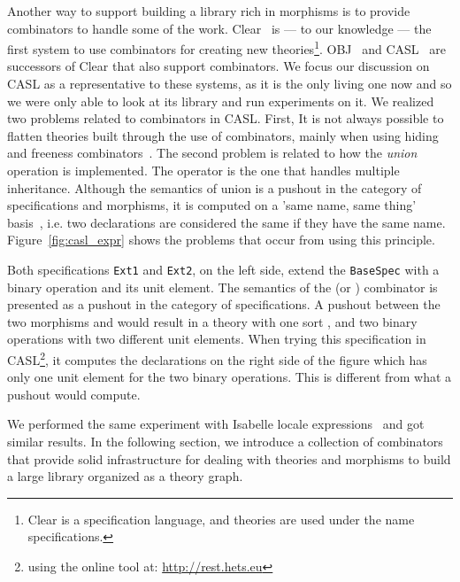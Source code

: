 Another way to support building a library rich in morphisms is to provide combinators to handle some of the work. Clear~\cite{Goguen1980} is --- to our knowledge --- the first system to use combinators for creating new theories\footnote{Clear is a specification language, and theories are used under the name specifications.}. OBJ~\cite{Obj2000Goguen} and CASL~\cite{CoFI:2004:CASL-RM} are successors of Clear that also support combinators. We focus our discussion on CASL as a representative to these systems, as it is the only living one now and so we were only able to look at its library and run experiments on it. 
We realized two problems related to combinators in CASL. First, It is not always possible to flatten theories built through the use of combinators, mainly when using hiding and freeness combinators~\cite{CoFI:2004:CASL-RM}. The second problem is related to how the \emph{union} operation is implemented. The  operator is the one that handles multiple inheritance. Although the semantics of union is a pushout in the category of specifications and morphisms, it is computed on a 'same name, same thing' basis~\cite{bidoit2003casl}, i.e. two declarations are considered the same if they have the same name. Figure~\ref{fig:casl_expr} shows the problems that occur from using this principle. 
\begin{figure}

\end{figure}
Both specifications \verb|Ext1| and \verb|Ext2|, on the left side, extend the \verb|BaseSpec| with a binary operation and its unit element. The semantics of the  (or ) combinator is presented as a pushout in the category of specifications. A pushout between the two morphisms  and  would result in a theory with one sort , and  two binary operations with two different unit elements. When trying this specification in CASL\footnote{using the online tool at: \url{http://rest.hets.eu}}, it computes the declarations on the right side of the figure which has only one unit element for the two binary operations. This is different from what a pushout would compute. 

We performed the same experiment with Isabelle locale expressions~\cite{ballarin2003locales} and got similar results. In the following section, we introduce a collection of combinators that provide solid infrastructure for dealing with theories and morphisms to build a large library organized as a theory graph. 

